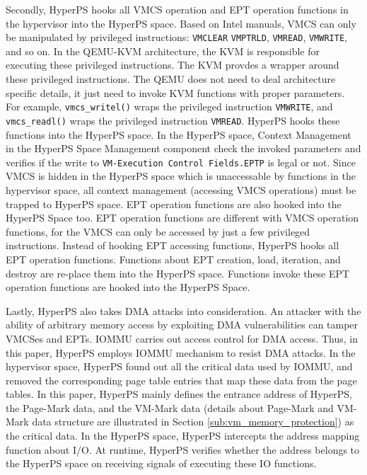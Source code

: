 Secondly,  HyperPS hooks all VMCS operation and EPT operation functions in the hypervisor into the HyperPS space.
Based on Intel manuals, VMCS can only be manipulated by privileged instructions: \verb|VMCLEAR| \verb|VMPTRLD|, \verb|VMREAD|, \verb|VMWRITE|, and so on.
In the QEMU-KVM architecture, the KVM is responsible for executing these privileged instructions. The KVM provdes a wrapper around these privileged instructions. The QEMU does not need to deal architecture specific details, it just need to invoke KVM functions with proper parameters. 
For example, \verb|vmcs_writel()| wraps the privileged instruction \verb|VMWRITE|, and \verb|vmcs_readl()| wraps the privileged instruction \verb|VMREAD|.
HyperPS hooks these functions into the HyperPS space. In the HyperPS space, Context Management in the HyperPS Space Management component check the invoked parameters and verifies if the write to \verb|VM-Execution Control Fields.EPTP| is legal or not. 
Since VMCS is hidden in the HyperPS space which is unaccessable by functions in the hypervisor space, all context management (accessing VMCS operations) must be trapped to HyperPS space. 
EPT operation functions are also hooked into the HyperPS Space too. EPT operation functions are different with VMCS operation functions, for the VMCS can only be accessed by just a few privileged instructions. Instead of hooking EPT accessing functions, HyperPS hooks all EPT operation functions. Functions about EPT creation, load, iteration, and destroy are re-place them into the HyperPS space. Functions invoke these EPT operation functions are hooked into the HyperPS Space.


Lastly, HyperPS also takes DMA attacks into consideration. An attacker with the ability of arbitrary memory access by exploiting DMA vulnerabilities can tamper VMCSes and EPTs. IOMMU carries out access control for DMA access. Thus, in this paper, HyperPS employs IOMMU mechanism to resist DMA attacks.
In the hypervisor space, HyperPS found out all the critical data used by IOMMU, and removed the corresponding page table entries that map these data from the page tables. In this paper, HyperPS mainly defines the entrance address of HyperPS, the Page-Mark data, and the VM-Mark data (details about Page-Mark and VM-Mark data structure are illustrated in Section \ref{sub:vm_memory_protection}) as the critical data.
In the HyperPS space, HyperPS intercepts the address mapping function about I/O. At runtime, HyperPS verifies whether the address belongs to the HyperPS space on receiving signals of executing these IO functions. 


